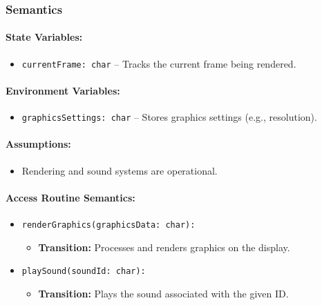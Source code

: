 \documentclass[12pt, titlepage]{article}
\begin{document}
\subsubsection{Semantics}

\paragraph{State Variables:}
\begin{itemize}
    \item \texttt{currentFrame: char} -- Tracks the current frame being rendered.
\end{itemize}

\paragraph{Environment Variables:}
\begin{itemize}
    \item \texttt{graphicsSettings: char} -- Stores graphics settings (e.g., resolution).
\end{itemize}

\paragraph{Assumptions:}
\begin{itemize}
    \item Rendering and sound systems are operational.
\end{itemize}

\paragraph{Access Routine Semantics:}
\begin{itemize}
    \item \texttt{renderGraphics(graphicsData: char):}
    \begin{itemize}
        \item \textbf{Transition:} Processes and renders graphics on the display.
    \end{itemize}
    \item \texttt{playSound(soundId: char):}
    \begin{itemize}
        \item \textbf{Transition:} Plays the sound associated with the given ID.
    \end{itemize}
\end{itemize}
\end{document}
